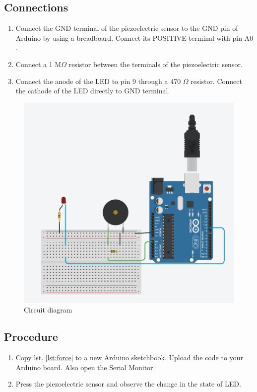 \subsection*{Connections}
\begin{enumerate}[leftmargin=*]
    \item Connect the GND terminal of the piezoelectric sensor to the GND pin of Arduino by using a breadboard. Connect its POSITIVE terminal with pin A$0$.
    \item Connect a 1 M$\Omega$ resistor between the terminals of the piezoelectric sensor.
    \item Connect the anode of the LED to pin 9 through a 470 $\Omega$ resistor. Connect the cathode of the LED directly to GND terminal.
\end{enumerate}

\begin{figure}[H]
    \centering
    \includegraphics[scale=0.7]{Figures/force.PNG}
    \caption{Circuit diagram}
\end{figure}

\subsection*{Procedure}
\begin{enumerate}[leftmargin=*]
    \item Copy lst. \ref{lst:force} to a new Arduino sketchbook. Upload the code to your Arduino board. Also open the Serial Monitor.
    \item Press the piezoelectric sensor and observe the change in the state of LED.
\end{enumerate}

